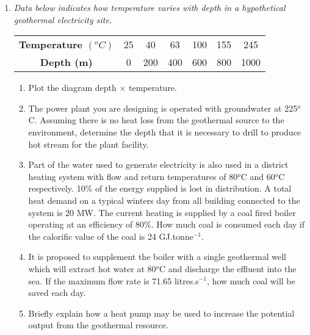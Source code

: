 \documentclass[12pts,a4paper,amsmath,amssymb,floatfix]{article}%
\begin{document}
\begin{enumerate}[label=\bfseries Problem \arabic*:]
%

\item\label{EasyQuestion} {\it Data below indicates how temperature varies with depth in a hypothetical geothermal electricity site. 
\begin{center}
\begin{tabular}{||c | c | c | c| c | c| c ||}
\hline\hline
{\bf Temperature $\left(^{o}C\right)$} & 25 & 40 & 63 & 100 & 155 & 245 \\
{\bf Depth (m)}                        & 0 & 200 & 400 & 600 & 800 & 1000 \\
\hline\hline
\end{tabular}
\end{center}
\begin{enumerate}
\item Plot the diagram depth $\times$ temperature. 
\item The power plant you are designing is operated with groundwater at 225$^{o}$C. Assuming there is no heat loss from the geothermal source to the environment, determine the depth that it is necessary to drill to produce hot stream for the plant facility.
\item Part of the water used to generate electricity is also used in a district heating system with flow and return temperatures of 80$^{o}$C and 60$^{o}$C respectively.  10$\%$ of the energy supplied is lost in distribution.  A total heat demand on a typical winters day from all building connected to the system is 20 MW. The current heating is supplied by a coal fired boiler operating at an efficiency of 80$\%$.  How much coal is consumed each day if the calorific value of the coal is 24 GJ.tonne$^{-1}$. 
\item It is proposed to supplement the boiler with a single geothermal well which will extract hot water at 80$^{o}$C and discharge the effluent into the sea.  If the maximum flow rate is 71.65 litres.s$^{-1}$,  how much coal will be saved each day. 
\item Briefly explain how a heat pump may be used to increase the potential output from the geothermal resource.
\end{enumerate}}

\begin{comment}
Total heat to be supplied (allowing for distribution loss) =   20 / 0.9		=   22.22 MW
Total net energy supplied in day =   22.22 x 10 6 x 24 x 60 x 60   / 1012	              =     1.92 TJ
Coal consumed in a day (allowing for efficiency)  =   1.92 x 1000 / 24 / 0.8         =    100 tonnes
									     =========
Energy supplied by geothermal heat =  flow rate * temperature difference * specific heat of water


\end{comment}
\end{enumerate}
\end{document}
